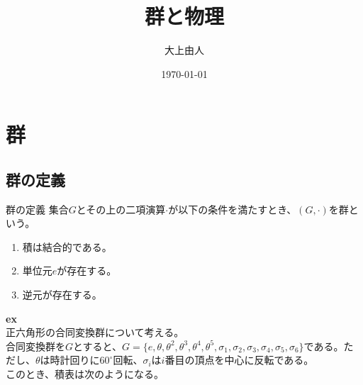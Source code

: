 \documentclass[a4paper,11pt]{jsarticle}
\begin{document}
\title{群と物理}
\author{大上由人}
\date{\today}
\maketitle

\section{群}
\subsection{群の定義}
\begin{itembox}[l]{群の定義}
    集合$G$とその上の二項演算$\cdot$が以下の条件を満たすとき、$(G,\cdot)$を群という。
    \begin{enumerate}
        \item 積は結合的である。
        \item 単位元$e$が存在する。
        \item 逆元が存在する。
    \end{enumerate}
\end{itembox}
\textbf{ex}\\
正六角形の合同変換群について考える。\\
合同変換群を$G$とすると、$G=\{e,\theta,\theta^2,\theta^3,\theta^4,\theta^5,\sigma_1,\sigma_2,\sigma_3,\sigma_4,\sigma_5,\sigma_6\}$である。ただし、$\theta$は時計回りに$60^\circ$回転、$\sigma_i$は$i$番目の頂点を中心に反転である。\\

このとき、積表は次のようになる。\\
\end{document}
